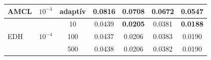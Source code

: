 \documentclass{beamer}
\begin{document}
\begin{frame}
\begin{table}[]
\begin{tabular}{lllllll}
            \hline
            \multicolumn{1}{|l|}{AMCL}                        & \multicolumn{1}{c|}{$10^{-4}$}                                   & \multicolumn{1}{c|}{adaptív}                                     & \multicolumn{1}{c|}{0.0816}                     & \multicolumn{1}{c|}{0.0708}                     & \multicolumn{1}{c|}{0.0672}                     & \multicolumn{1}{c|}{0.0547}                     \\ \hline
            \multicolumn{1}{|l|}{\multirow{3}{*}{EDH}}        & \multicolumn{1}{c|}{\multirow{3}{*}{$10^{-4}$}}                  & \multicolumn{1}{c|}{10}                                          & \multicolumn{1}{c|}{0.0439}                     & \multicolumn{1}{c|}{\textbf{0.0205}}            & \multicolumn{1}{c|}{0.0381}                     & \multicolumn{1}{c|}{\textbf{0.0188}}            \\ \cline{3-7}
            \multicolumn{1}{|l|}{}                            & \multicolumn{1}{c|}{}                                            & \multicolumn{1}{c|}{100}                                         & \multicolumn{1}{c|}{0.0437}                     & \multicolumn{1}{c|}{0.0206}                     & \multicolumn{1}{c|}{0.0383}                     & \multicolumn{1}{c|}{0.0190}                     \\ \cline{3-7}
            \multicolumn{1}{|l|}{}                            & \multicolumn{1}{c|}{}                                            & \multicolumn{1}{c|}{500}                                         & \multicolumn{1}{c|}{0.0438}                     & \multicolumn{1}{c|}{0.0206}                     & \multicolumn{1}{c|}{0.0382}                     & \multicolumn{1}{c|}{0.0190}                     \\ \hline
        \end{tabular}
    \end{table}
\end{frame}
\end{document}
